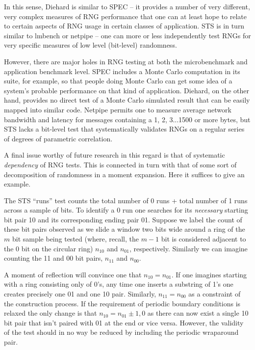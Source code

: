 \documentclass{book}
\begin{document}
In this sense, Diehard is similar to SPEC -- it provides a number of
very different, very complex measures of RNG performance that one can at
least hope to relate to certain aspects of RNG usage in certain classes
of application.  STS is in turn similar to lmbench or netpipe -- one can
more or less independently test RNGs for very specific measures of low
level (bit-level) randomness.

However, there are major holes in RNG testing at both the microbenchmark
and application benchmark level.  SPEC includes a Monte Carlo
computation in its suite, for example, so that people doing Monte Carlo
can get some idea of a system's probable performance on that kind of
application.  Diehard, on the other hand, provides no direct test of a
Monte Carlo simulated result that can be easily mapped into similar
code.  Netpipe permits one to measure average network bandwidth and
latency for messages containing a 1, 2, 3...1500 or more bytes, but STS
lacks a bit-level test that systematically validates RNGs on a regular
series of degrees of parametric correlation.

A final issue worthy of future research in this regard is that of
systematic {\em dependency} of RNG tests.  This is connected in turn
with that of some sort of decomposition of randomness in a moment
expansion.  Here it suffices to give an example.  

The STS ``runs'' test counts the total number of 0 runs + total number
of 1 runs across a sample of bits.  To identify a 0 run one searches for
its {\em necessary} starting bit pair 10 and its corresponding ending
pair 01.  Suppose we label the count of these bit pairs observed as we
slide a window two bits wide around a ring of the $m$ bit sample being
tested (where, recall, the $m-1$ bit is considered adjacent to the $0$
bit on the circular ring) $n_{10}$ and $n_{01}$, respectively.  Similarly
we can imagine counting the 11 and 00 bit pairs, $n_{11}$ and $n_{00}$.

A moment of reflection will convince one that $n_{10} = n_{01}$.  If one
imagines starting with a ring consisting only of 0's, any time one
inserts a substring of 1's one creates precisely one 01 and one 10 pair.
Similarly, $n_{11} = n_{00}$ as a constraint of the construction
process.  If the requirement of periodic boundary conditions is relaxed
the only change is that $n_{10} = n_{01} \pm 1,0$ as there can now exist
a single 10 bit pair that isn't paired with 01 at the end or vice versa.
However, the validity of the test should in no way be reduced by
including the periodic wraparound pair.
\end{document}
